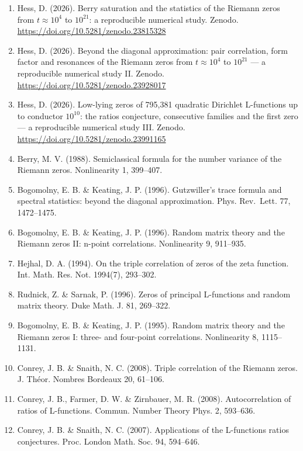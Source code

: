 \documentclass[
  10pt,
]{article}
\providecommand{\tightlist}{%
  \setlength{\itemsep}{0pt}\setlength{\parskip}{0pt}}
\begin{document}
\begin{enumerate}
\def\labelenumi{\arabic{enumi}.}
\tightlist
\item
  Hess, D. (2026). Berry saturation and the statistics of the Riemann
  zeros from \(t \approx 10^4\) to \(10^{21}\): a reproducible numerical
  study. Zenodo. \url{https://doi.org/10.5281/zenodo.23815328}
\item
  Hess, D. (2026). Beyond the diagonal approximation: pair correlation,
  form factor and resonances of the Riemann zeros from
  \(t \approx 10^4\) to \(10^{21}\) --- a reproducible numerical study
  II. Zenodo. \url{https://doi.org/10.5281/zenodo.23928017}
\item
  Hess, D. (2026). Low-lying zeros of 795,381 quadratic Dirichlet
  L-functions up to conductor \(10^{10}\): the ratios conjecture,
  consecutive families and the first zero --- a reproducible numerical
  study III. Zenodo. \url{https://doi.org/10.5281/zenodo.23991165}
\item
  Berry, M. V. (1988). Semiclassical formula for the number variance of
  the Riemann zeros. Nonlinearity 1, 399--407.
\item
  Bogomolny, E. B. \& Keating, J. P. (1996). Gutzwiller's trace formula
  and spectral statistics: beyond the diagonal approximation. Phys.
  Rev.~Lett. 77, 1472--1475.
\item
  Bogomolny, E. B. \& Keating, J. P. (1996). Random matrix theory and
  the Riemann zeros II: n-point correlations. Nonlinearity 9, 911--935.
\item
  Hejhal, D. A. (1994). On the triple correlation of zeros of the zeta
  function. Int. Math. Res. Not. 1994(7), 293--302.
\item
  Rudnick, Z. \& Sarnak, P. (1996). Zeros of principal L-functions and
  random matrix theory. Duke Math. J. 81, 269--322.
\item
  Bogomolny, E. B. \& Keating, J. P. (1995). Random matrix theory and
  the Riemann zeros I: three- and four-point correlations. Nonlinearity
  8, 1115--1131.
\item
  Conrey, J. B. \& Snaith, N. C. (2008). Triple correlation of the
  Riemann zeros. J. Théor. Nombres Bordeaux 20, 61--106.
\item
  Conrey, J. B., Farmer, D. W. \& Zirnbauer, M. R. (2008).
  Autocorrelation of ratios of L-functions. Commun. Number Theory Phys.
  2, 593--636.
\item
  Conrey, J. B. \& Snaith, N. C. (2007). Applications of the L-functions
  ratios conjectures. Proc. London Math. Soc. 94, 594--646.

\end{enumerate}
\end{document}
